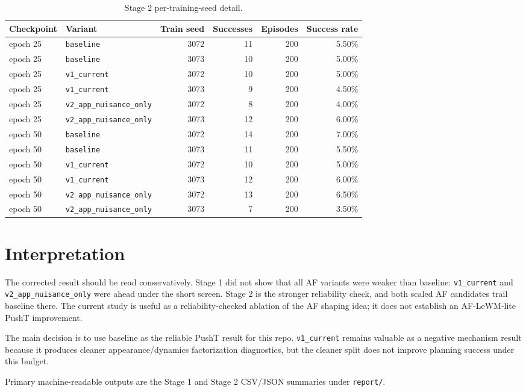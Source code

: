\documentclass[11pt]{article}
\begin{document}
\begin{table}[H]
\centering
\scriptsize
\begin{tabular}{llrrrr}
\toprule
Checkpoint & Variant & Train seed & Successes & Episodes & Success rate \\
\midrule
epoch 25 & \texttt{baseline} & 3072 & 11 & 200 & 5.50\% \\
epoch 25 & \texttt{baseline} & 3073 & 10 & 200 & 5.00\% \\
epoch 25 & \texttt{v1\_current} & 3072 & 10 & 200 & 5.00\% \\
epoch 25 & \texttt{v1\_current} & 3073 & 9 & 200 & 4.50\% \\
epoch 25 & \texttt{v2\_app\_nuisance\_only} & 3072 & 8 & 200 & 4.00\% \\
epoch 25 & \texttt{v2\_app\_nuisance\_only} & 3073 & 12 & 200 & 6.00\% \\
epoch 50 & \texttt{baseline} & 3072 & 14 & 200 & 7.00\% \\
epoch 50 & \texttt{baseline} & 3073 & 11 & 200 & 5.50\% \\
epoch 50 & \texttt{v1\_current} & 3072 & 10 & 200 & 5.00\% \\
epoch 50 & \texttt{v1\_current} & 3073 & 12 & 200 & 6.00\% \\
epoch 50 & \texttt{v2\_app\_nuisance\_only} & 3072 & 13 & 200 & 6.50\% \\
epoch 50 & \texttt{v2\_app\_nuisance\_only} & 3073 & 7 & 200 & 3.50\% \\
\bottomrule
\end{tabular}
\caption{Stage 2 per-training-seed detail.}
\end{table}

\section*{Interpretation}
The corrected result should be read conservatively. Stage 1 did not show that all AF variants were weaker than baseline: \texttt{v1\_current} and \texttt{v2\_app\_nuisance\_only} were ahead under the short screen. Stage 2 is the stronger reliability check, and both scaled AF candidates trail baseline there. The current study is useful as a reliability-checked ablation of the AF shaping idea; it does not establish an AF-LeWM-lite PushT improvement.

The main decision is to use baseline as the reliable PushT result for this repo. \texttt{v1\_current} remains valuable as a negative mechanism result because it produces cleaner appearance/dynamics factorization diagnostics, but the cleaner split does not improve planning success under this budget.

\vfill
{\small\color{muted}
Primary machine-readable outputs are the Stage 1 and Stage 2 CSV/JSON summaries under \texttt{report/}.
}
\end{document}
